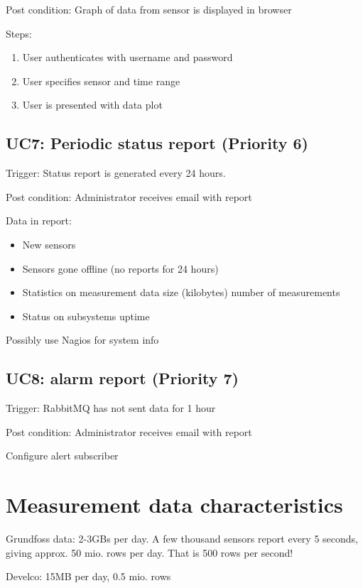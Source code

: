 \noindent Post condition: Graph of data from sensor is displayed in browser

\noindent Steps: 
\begin{enumerate}
    \item User authenticates with username and password
    \item User specifies sensor and time range
    \item User is presented with data plot
\end{enumerate}

\subsection*{UC7: Periodic status report (Priority 6)}
\noindent Trigger: Status report is generated every 24 hours.

\noindent Post condition: Administrator receives email with report

\noindent Data in report: 
\begin{itemize}
    \item New sensors
    \item Sensors gone offline (no reports for 24 hours)
    \item Statistics on measurement data
        \subitem size (kilobytes)
        \subitem number of measurements
    \item Status on subsystems 
        \subitem uptime
\end{itemize}
Possibly use Nagios for system info


\subsection*{UC8: alarm report (Priority 7)}
\noindent Trigger: RabbitMQ has not sent data for 1 hour

\noindent Post condition: Administrator receives email with report

Configure alert subscriber

\section{Measurement data characteristics}
Grundfoss data: 2-3GBs per day. A few thousand sensors report every 5 seconds, giving approx. 50 mio. rows per day. That is 500 rows per second!

Develco: 15MB per day, 0.5 mio. rows
